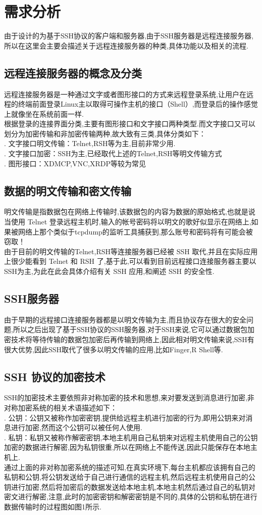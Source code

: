 \documentclass[UTF8,nofonts,a4paper]{ctexart}
\begin{document}
\section{需求分析}
由于设计的为基于SSH协议的客户端和服务器,由于SSH服务器是远程连接服务器,所以在这里会主要会描述关于远程连接服务器的种类,具体功能以及相关的流程.
\subsection{远程连接服务器的概念及分类}
远程连接服务器是一种通过文字或者图形接口的方式来远程登录系统,让用户在远程的终端前面登录Linux主以取得可操作主机的接口（Shell）,而登录后的操作感觉上就像坐在系统前面一样.\\
\indent 根据登录的连接界面分类,主要有图形接口和文字接口两种类型.而文字接口又可以划分为加密传输和非加密传输两种,故大致有三类,具体分类如下：\\
. 文字接口明文传输：Telnet,RSH等为主,目前非常少用.\\
. 文字接口加密：SSH为主,已经取代上述的Telnet,RSH等明文传输方式\\
. 图形接口：XDMCP,VNC,XRDP等较为常见
\subsection{数据的明文传输和密文传输}
明文传输是指数据包在网络上传输时,该数据包的内容为数据的原始格式,也就是说当使用 Telnet 登录远程主机时,输入的帐号密码将以明文的歌好似显示在网络上,如果被网络上那个类似于tcpdump的监听工具捕获到,那么账号和密码将有可能会被窃取！\\
\indent 由于目前的明文传输的Telnet,RSH等连接服务器已经被 SSH 取代,并且在实际应用上很少能看到 Telnet 和 RSH 了,基于此,可以看到目前远程接口连接服务器主要以SSH为主,为此在此会具体介绍有关 SSH 应用,和阐述 SSH 的安全性.
\subsection{SSH服务器}
由于早期的远程接口连接服务器都是以明文传输为主,而且协议存在很大的安全问题,所以之后出现了基于SSH协议的SSH服务器,对于SSH来说,它可以通过数据包加密技术将等待传输的数据包加密后再传输到网络上,因此相对明文传输来说,SSH有很大优势,因此SSH取代了很多以明文传输的应用,比如Finger,R Shell等.
\subsection{SSH 协议的加密技术}
SSH的加密技术主要依照非对称加密的技术和思想,来对要发送到消息进行加密,非对称加密系统的相关术语描述如下：\\
. 公钥：公钥又被称作加密密钥,提供给远程主机进行加密的行为,即用公钥来对消息进行加密,然而这个公钥可以被任何人使用.\\
. 私钥：私钥又被称作解密密钥,本地主机用自己私钥来对远程主机使用自己的公钥加密的数据进行解密,因为私钥很重,所以在网络上不能传送,因此只能保存在本地主机上.\\
\indent 通过上面的非对称加密系统的描述可知,在真实环境下,每台主机都应该拥有自己的私钥和公钥,将公钥发送给于自己进行通信的远程主机,然后远程主机使用自己的公钥进行加密,然后将加密后的数据发送给本地主机,本地主机然后通过自己的私钥对密文进行解密,注意,此时的加密密钥和解密密钥是不同的,具体的公钥和私钥在进行数据传输时的过程图如图1所示.
\end{document}

